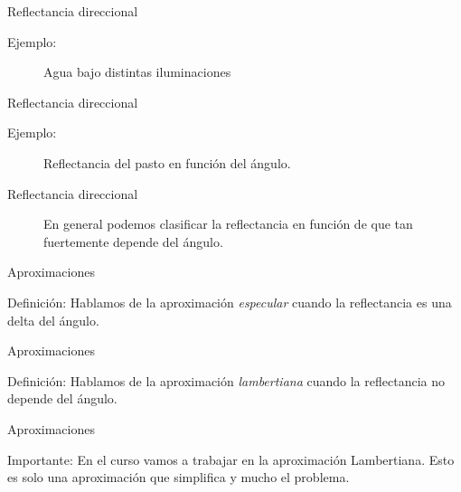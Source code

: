 \documentclass[handout,draft]{beamer}
\begin{document}
\begin{frame}{Reflectancia direccional}
  \begin{exampleblock}{Ejemplo:}
    \begin{figure}
      \caption{Agua bajo distintas iluminaciones}
    \end{figure}
  \end{exampleblock}
\end{frame}

\begin{frame}{Reflectancia direccional}
  \begin{exampleblock}{Ejemplo:}
    \begin{figure}
      \caption{Reflectancia del pasto en función del ángulo.}
    \end{figure}
  \end{exampleblock}
\end{frame}

\begin{frame}{Reflectancia direccional}
  \begin{figure}
    \caption{En general podemos clasificar la reflectancia en función de que tan fuertemente depende del ángulo.}
  \end{figure}
\end{frame}

\begin{frame}{Aproximaciones}
  \begin{block}{Definición:}
    Hablamos de la aproximación \emph{especular} cuando la reflectancia es una delta del ángulo.
  \end{block}
\end{frame}

\begin{frame}{Aproximaciones}
  \begin{block}{Definición:}
    Hablamos de la aproximación \emph{lambertiana} cuando la reflectancia no depende del ángulo.
  \end{block}
\end{frame}

\begin{frame}{Aproximaciones}
  \begin{alertblock}{Importante:}
    En el curso vamos a trabajar en la aproximación Lambertiana. Esto es solo una aproximación que simplifica y mucho el problema.
  \end{alertblock}
\end{frame}
\end{document}
